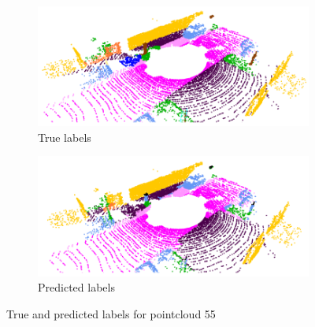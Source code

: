 \begin{figure}[ht]
    \centering
    \begin{subfigure}[b]{0.45\textwidth}
        \centering
        \includegraphics[width=\textwidth]{images/true.png}
        \caption{True labels}
        \label{fig:true}
    \end{subfigure}
    \hfill
    \begin{subfigure}[b]{0.45\textwidth}
        \centering
        \includegraphics[width=\textwidth]{images/pred.png}
        \caption{Predicted labels}
        \label{fig:pred}
    \end{subfigure}
    \caption{True and predicted labels for pointcloud 55}
    \label{fig:visual}
\end{figure}

